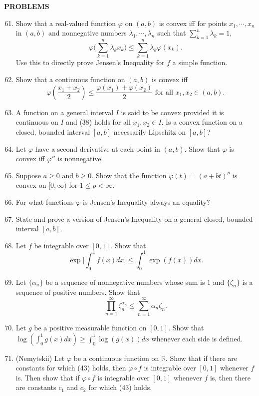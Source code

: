 \begin{center}
	\textbf{PROBLEMS}
\end{center}
\begin{enumerate}
	\setcounter{enumi}{60}
	\item Show that a real-valued function $\varphi$ on $(a,b)$ is convex iff for points $x_1,\cdots,x_n$ in $(a,b)$ and nonnegative numbers $\lambda_1,\cdots,\lambda_n$ such that $\sum_{k=1}^n \lambda_k=1$,
	\[
        \varphi \biggr ( \sum_{k=1}^n \lambda_k x_k \biggl ) \le \sum_{k=1}^n \lambda_k \varphi(x_k).   
    \]
    Use this to directly prove Jensen's Inequality for $f$ a simple function.
    \item Show that a continuous function on $(a,b)$ is convex iff
    \[
        \varphi(\frac{x_1+x_2}{2})\le\frac{\varphi(x_1)+\varphi(x_2)}{2}\text{ for all }x_1,x_2\in (a,b).  
    \]
    \item A function on a general interval $I$ is said to be convex provided it is continuous on $I$ and (38) holds for all $x_1,x_2\in I$.
    Is a convex function on a closed, bounded interval $[a,b]$ necessarily Lipschitz on $[a,b]$?
    \item Let $\varphi$ have a second derivative at each point in $(a,b)$.
    Show that $\varphi$ is convex iff $\varphi''$ is nonnegative.
    \item Suppose $a\ge 0$ and $b\ge 0$.
    Show that the function $\varphi(t)=(a+bt)^p$ is convex on $[0,\infty)$ for $1\le p < \infty$.
    \item For what functions $\varphi$ is Jensen's Inequality always an equality?
    \item State and prove a version of Jensen's Inequality on a general closed, bounded interval $[a,b]$.
    \item Let $f$ be integrable over $[0,1]$. Show that 
    \[
    \exp\biggl [\int_0^1f(x)dx\biggr ] \le \int_0^1 \exp(f(x))dx.   
    \]
    \item Let $\{\alpha_n\}$ be a sequence of nonnegative numbers whose sum is $1$ and $\{\zeta_n\}$ is a sequence of positive numbers. Show that
    \[
    \prod_{n=1}^\infty \zeta_n^{\alpha_n} \le \sum_{n=1}^\infty \alpha_n \zeta_n. 
    \]
    \item Let $g$ be a positive measurable function on $[0,1]$. Show that $\log(\int_0^1g(x)dx) \ge\int_0^1\log(g(x))dx$ whenever each side is defined.
    \item (Nemytskii) Let $\varphi$ be a continuous function on $\mathbb{R}$.
    Show that if there are constants for which (43) holds, then $\varphi\circ f$ is integrable over $[0,1]$ whenever $f$ is.
    Then show that if $\varphi\circ f$ is integrable over $[0,1]$ whenever $f$ is, then there are constants $c_1$ and $c_2$ for which (43) holds.
\end{enumerate}